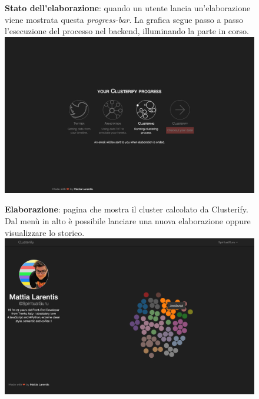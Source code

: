         	\begin{figure}[p]
		\textbf{Stato dell'elaborazione}: quando un utente lancia un'elaborazione viene mostrata questa \emph{progress-bar}. La grafica segue passo a passo l'esecuzione del processo nel backend, illuminando la parte in corso.\\

        		\includegraphics[width=\textwidth]{img/clusterify/process.png}
        	\end{figure}
        
        	\begin{figure}[p]
		\textbf{Elaborazione}: pagina che mostra il cluster calcolato da Clusterify. Dal menù in alto è possibile lanciare una nuova elaborazione oppure visualizzare lo storico.\\

        		\includegraphics[width=\textwidth]{img/clusterify/elaboration.png}
        	\end{figure}
        
